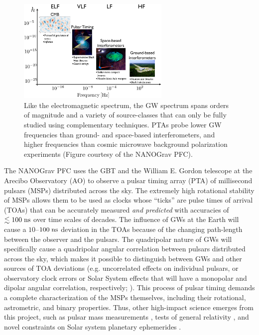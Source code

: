 \documentclass[10pt]{myNSF}
\begin{document}
\begin{figure}
  \centering
  \includegraphics[width=0.65\textwidth]{gw_spectrum.png}
  \caption{Like the electromagnetic spectrum, the GW spectrum spans
    orders of magnitude and a variety of source-classes that can only
    be fully studied using complementary techniques.  PTAs probe lower
    GW frequencies than ground- and space-based interferometers, and
    higher frequencies than cosmic microwave background polarization
    experiments (Figure courtesy of the NANOGrav
    PFC). \label{fig:gw_spectrum}}
\end{figure}

The NANOGrav PFC uses the GBT and the William E. Gordon telescope at
the Arecibo Observatory (AO) to observe a pulsar timing array (PTA) of
millisecond pulsars (MSPs) distributed across the sky.  The extremely
high rotational stability of MSPs allows them to be used as clocks
whose ``ticks'' are pulse times of arrival (TOAs) that can be
accurately measured \emph{and predicted} with accuracies of $\lesssim
100\; \textrm{ns}$ over time scales of decades.  The influence of GWs at the
Earth will cause a $10$--$100\; \textrm{ns}$ deviation in the TOAs because of
the changing path-length between the observer and the pulsars.  The
quadripolar nature of GWs will specifically cause a quadripolar
angular correlation between pulsars distributed across the sky, which
makes it possible to distinguish between GWs and other sources of TOA
deviations (e.g. uncorrelated effects on individual pulsars, or
observatory clock errors or Solar System effects that will have a
monopolar and dipolar angular correlation, respectively; \cite{hd83}).
This process of pulsar timing demands a complete characterization of
the MSPs themselves, including their rotational, astrometric, and
binary properties.  Thus, other high-impact science emerges from this
project, such as pulsar mass measurements \citep{epe+16}, tests of
general relativity \citep{zsd+15}, and novel constraints on Solar
system planetary ephemerides \citep{abb+18}.
\end{document}
